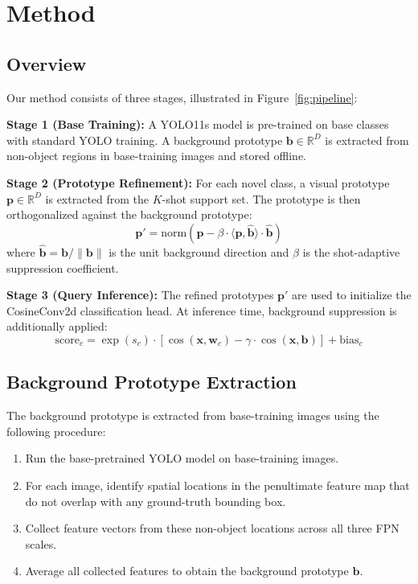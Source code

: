 \documentclass[10pt,twocolumn,letterpaper]{article}
\begin{document}
\section{Method}
\label{sec:method}

\subsection{Overview}

Our method consists of three stages, illustrated in Figure~\ref{fig:pipeline}:

\textbf{Stage 1 (Base Training):} A YOLO11s model is pre-trained on base classes
with standard YOLO training. A background prototype $\mathbf{b} \in \mathbb{R}^D$ is extracted
from non-object regions in base-training images and stored offline.

\textbf{Stage 2 (Prototype Refinement):} For each novel class, a visual prototype
$\mathbf{p} \in \mathbb{R}^D$ is extracted from the $K$-shot support set.
The prototype is then orthogonalized against the background prototype:
\begin{equation}
\label{eq:orthogonalize}
\mathbf{p}' = \text{norm}\left(\mathbf{p} - \beta \cdot \langle\mathbf{p}, \hat{\mathbf{b}}\rangle \cdot \hat{\mathbf{b}}\right)
\end{equation}
where $\hat{\mathbf{b}} = \mathbf{b} / \|\mathbf{b}\|$ is the unit background direction
and $\beta$ is the shot-adaptive suppression coefficient.

\textbf{Stage 3 (Query Inference):} The refined prototypes $\mathbf{p}'$ are used to
initialize the CosineConv2d classification head. At inference time, background suppression
is additionally applied:
\begin{equation}
\label{eq:inference}
\text{score}_c = \exp(s_c) \cdot \left[\cos(\mathbf{x}, \mathbf{w}_c) - \gamma \cdot \cos(\mathbf{x}, \mathbf{b})\right] + \text{bias}_c
\end{equation}

\subsection{Background Prototype Extraction}

The background prototype is extracted from base-training images using the following procedure:
\begin{enumerate}
    \item Run the base-pretrained YOLO model on base-training images.
    \item For each image, identify spatial locations in the penultimate feature map
          that do not overlap with any ground-truth bounding box.
    \item Collect feature vectors from these non-object locations across all three FPN scales.
    \item Average all collected features to obtain the background prototype $\mathbf{b}$.
\end{enumerate}
\end{document}
